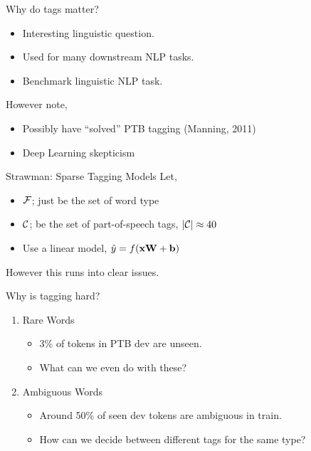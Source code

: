 \documentclass{beamer}
\begin{document}
\begin{frame}{Why do tags matter?}
  \begin{itemize}
    \item Interesting linguistic question.
      \air 

    \item Used for many downstream NLP tasks. 
    \air

    \item Benchmark linguistic NLP task. 
  \end{itemize}
  \pause

  However note, 

  \begin{itemize}
  \item Possibly have ``solved'' PTB tagging (Manning, 2011)
    \air 

  \item Deep Learning skepticism  
  \end{itemize}
\end{frame}

\begin{frame}{Strawman: Sparse Tagging Models}
  Let,
  \begin{itemize}
  \item $\mathcal{F}$; just be the set of word type
    \air 
  \item $\mathcal{C}$; be the set of part-of-speech tags, $|\mathcal{C}|\approx 40$
    \air
  \item Use a linear model, $\hat{y} = f(\mathbf{x} \mathbf{W} + \mathbf{b})$ 
  \end{itemize}
  However this runs into clear issues.

\end{frame}


\begin{frame}{Why is tagging hard?}
  \begin{enumerate}
  \item 
  Rare Words
  \begin{itemize}
  \item 3\% of tokens in PTB dev are unseen.
  \item What can we even do with these? 
  \end{itemize}
  
  \item Ambiguous Words
  \begin{itemize}
  \item Around 50\% of seen dev tokens are ambiguous in train.
  \item How can we decide between different tags for the same type?
  \end{itemize}
  \end{enumerate}
\end{frame}
\end{document}
